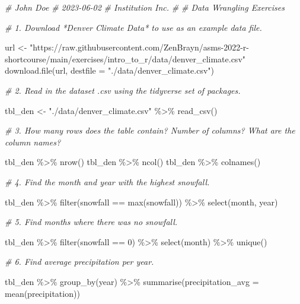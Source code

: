 \documentclass[
]{book}
\newenvironment{Shaded}{\begin{snugshade}}{\end{snugshade}}
\newcommand{\AttributeTok}[1]{\textcolor[rgb]{0.77,0.63,0.00}{#1}}
\newcommand{\CommentTok}[1]{\textcolor[rgb]{0.56,0.35,0.01}{\textit{#1}}}
\newcommand{\DecValTok}[1]{\textcolor[rgb]{0.00,0.00,0.81}{#1}}
\newcommand{\FunctionTok}[1]{\textcolor[rgb]{0.00,0.00,0.00}{#1}}
\newcommand{\NormalTok}[1]{#1}
\newcommand{\OtherTok}[1]{\textcolor[rgb]{0.56,0.35,0.01}{#1}}
\newcommand{\SpecialCharTok}[1]{\textcolor[rgb]{0.00,0.00,0.00}{#1}}
\newcommand{\StringTok}[1]{\textcolor[rgb]{0.31,0.60,0.02}{#1}}
\begin{document}
\begin{Shaded}
\begin{Highlighting}[]
\CommentTok{\# John Doe}
\CommentTok{\# 2023{-}06{-}02}
\CommentTok{\# Institution Inc.}
\CommentTok{\#}
\CommentTok{\# Data Wrangling Exercises}

\CommentTok{\# 1. Download *Denver Climate Data* to use as an example data file.}

\NormalTok{url }\OtherTok{\textless{}{-}} \StringTok{"https://raw.githubusercontent.com/ZenBrayn/asms{-}2022{-}r{-}shortcourse/main/exercises/intro\_to\_r/data/denver\_climate.csv"}
\FunctionTok{download.file}\NormalTok{(url, }\AttributeTok{destfile =} \StringTok{"./data/denver\_climate.csv"}\NormalTok{)}


\CommentTok{\# 2. Read in the dataset .csv using the \textasciigrave{}tidyverse\textasciigrave{} set of packages.}

\NormalTok{tbl\_den }\OtherTok{\textless{}{-}} \StringTok{"./data/denver\_climate.csv"} \SpecialCharTok{\%\textgreater{}\%} \FunctionTok{read\_csv}\NormalTok{()}


\CommentTok{\# 3. How many rows does the table contain? Number of columns? What are the column names?}

\NormalTok{tbl\_den }\SpecialCharTok{\%\textgreater{}\%} \FunctionTok{nrow}\NormalTok{()}
\NormalTok{tbl\_den }\SpecialCharTok{\%\textgreater{}\%} \FunctionTok{ncol}\NormalTok{()}
\NormalTok{tbl\_den }\SpecialCharTok{\%\textgreater{}\%} \FunctionTok{colnames}\NormalTok{()}


\CommentTok{\# 4. Find the month and year with the highest snowfall.}

\NormalTok{tbl\_den }\SpecialCharTok{\%\textgreater{}\%} 
  \FunctionTok{filter}\NormalTok{(snowfall }\SpecialCharTok{==} \FunctionTok{max}\NormalTok{(snowfall)) }\SpecialCharTok{\%\textgreater{}\%} 
  \FunctionTok{select}\NormalTok{(month, year)}


\CommentTok{\# 5. Find months where there was no snowfall.}

\NormalTok{tbl\_den }\SpecialCharTok{\%\textgreater{}\%} 
  \FunctionTok{filter}\NormalTok{(snowfall }\SpecialCharTok{==} \DecValTok{0}\NormalTok{) }\SpecialCharTok{\%\textgreater{}\%} 
  \FunctionTok{select}\NormalTok{(month) }\SpecialCharTok{\%\textgreater{}\%} 
  \FunctionTok{unique}\NormalTok{()}


\CommentTok{\# 6. Find average precipitation per year.}

\NormalTok{tbl\_den }\SpecialCharTok{\%\textgreater{}\%} 
  \FunctionTok{group\_by}\NormalTok{(year) }\SpecialCharTok{\%\textgreater{}\%} 
  \FunctionTok{summarise}\NormalTok{(}\AttributeTok{precipitation\_avg =} \FunctionTok{mean}\NormalTok{(precipitation))}



\end{Highlighting}
\end{Shaded}
\end{document}
